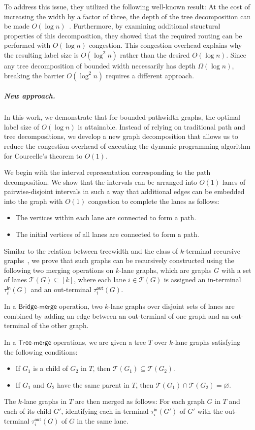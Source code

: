 \documentclass[11pt]{article}
\theoremstyle{definition}
\theoremstyle{remark}
\renewcommand{\emptyset}{\varnothing}
\newcommand{\tin}{\tau^{\mathsf{in}}}
\newcommand{\tout}{\tau^{\mathsf{out}}}
\newcommand{\tmerge}{\mathsf{Tree}\text{-}\mathsf{merge}}
\newcommand{\bmerge}{\mathsf{Bridge}\text{-}\mathsf{merge}}
\begin{document}
To address this issue, they utilized the following well-known result: At the cost of increasing the width by a factor of three, the depth of the tree decomposition can be made $O(\log n)$~\cite{bodlaender1989nc}. Furthermore, by examining additional structural properties of this decomposition, they showed that the required routing can be performed with $O(\log n)$ congestion. This congestion overhead explains why the resulting label size is $O(\log^2 n)$ rather than the desired $O(\log n)$. Since any tree decomposition of bounded width necessarily has depth $\Omega(\log n)$, breaking the barrier $O(\log^2 n)$ requires a different approach.



\subparagraph{New approach.} In this work, we demonstrate that for bounded-pathwidth graphs, the optimal label size of $O(\log n)$ is attainable. Instead of relying on traditional path and tree decompositions, we develop a new graph decomposition that allows us to reduce the congestion overhead of executing the dynamic programming algorithm for Courcelle’s theorem to $O(1)$.


We begin with the interval representation corresponding to the path decomposition. We show that the intervals can be arranged into $O(1)$ lanes of pairwise-disjoint intervals in such a way that additional edges can be  embedded into the graph with $O(1)$ congestion to complete the lanes as follows:
\begin{itemize}
    \item The vertices within each lane are connected to form a path.
    \item The initial vertices of all lanes are connected to form a path.
\end{itemize}

Similar to the relation between treewidth and the class of $k$-terminal recursive graphs~\cite{bodlaender1998partial}, we prove that such graphs can be recursively constructed using the following two merging operations on $k$-lane graphs, which are graphs $G$ with a set of lanes $\mathcal{T}(G) \subseteq [k]$, where each lane $i \in \mathcal{T}(G)$ is assigned an in-terminal $\tin_i(G)$ and an out-terminal $\tout_i(G)$. 

 In a $\bmerge$ operation, two $k$-lane graphs over disjoint sets of lanes are combined by adding an edge between an out-terminal of one graph and an out-terminal of the other graph. 
 
 In a $\tmerge$ operations, we are given a tree $T$ over $k$-lane graphs satisfying the following conditions:
 \begin{itemize}
    \item If $G_1$ is a child of $G_2$ in $T$, then $\mathcal{T}(G_1) \subseteq \mathcal{T}(G_2)$.
    \item If $G_1$ and $G_2$ have the same parent in $T$, then $\mathcal{T}(G_1) \cap \mathcal{T}(G_2) = \emptyset$.  
\end{itemize}
The $k$-lane graphs in $T$ are then merged as follows: For each graph $G$ in $T$ and each of its child $G'$, identifying each in-terminal $\tin_i(G')$ of $G'$ with the out-terminal $\tout_i(G)$ of $G$ in the same lane. 
\end{document}
